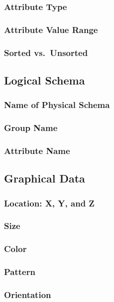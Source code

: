 \subsubsection{Attribute Type}
\subsubsection{Attribute Value Range}
\subsubsection{Sorted vs.\ Unsorted}

\subsection{Logical Schema}

\subsubsection{Name of Physical Schema}
\subsubsection{Group Name}
\subsubsection{Attribute Name}

\subsection{Graphical Data}

\subsubsection{Location: X, Y, and Z}
\subsubsection{Size}
\subsubsection{Color}
\subsubsection{Pattern}
\subsubsection{Orientation}
